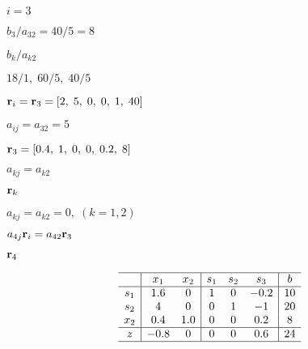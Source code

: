 \documentclass{article}
\def\lthtmlcheckvsize{\ifdim\ht\sizebox<\vsize 
  \ifdim\wd\sizebox<\hsize\expandafter\hfill\fi \expandafter\vfill
  \else\expandafter\vss\fi}%
\begin{document}
{\newpage\clearpage
{}%
$ i=3$%
\lthtmlindisplaymathZ
\lthtmlcheckvsize\clearpage}

{\newpage\clearpage
{}%
$ b_3/a_{32}=40/5=8$%
\lthtmlindisplaymathZ
\lthtmlcheckvsize\clearpage}

{\newpage\clearpage
{}%
$ b_k/a_{k2}$%
\lthtmlindisplaymathZ
\lthtmlcheckvsize\clearpage}

{\newpage\clearpage
{}%
$ 18/1,\;60/5,\;40/5$%
\lthtmlindisplaymathZ
\lthtmlcheckvsize\clearpage}

{\newpage\clearpage
{}%
$ {\bf r}_i={\bf r}_3=[2,\;5,\;0,\;0,\;1,\;40]$%
\lthtmlindisplaymathZ
\lthtmlcheckvsize\clearpage}

{\newpage\clearpage
{}%
$ a_{ij}=a_{32}=5$%
\lthtmlindisplaymathZ
\lthtmlcheckvsize\clearpage}

{\newpage\clearpage
{}%
$ {\bf r}_3=[0.4,\;1,\;0,\;0,\;0.2,\;8]$%
\lthtmlindisplaymathZ
\lthtmlcheckvsize\clearpage}

{\newpage\clearpage
{}%
$ a_{kj}=a_{k2}$%
\lthtmlindisplaymathZ
\lthtmlcheckvsize\clearpage}

{\newpage\clearpage
{}%
$ {\bf r}_k$%
\lthtmlindisplaymathZ
\lthtmlcheckvsize\clearpage}

{\newpage\clearpage
{}%
$ a_{kj}=a_{k2}=0, \;(k=1,2)$%
\lthtmlindisplaymathZ
\lthtmlcheckvsize\clearpage}

{\newpage\clearpage
{}%
$ a_{4j}{\bf r}_i=a_{42}{\bf r}_3$%
\lthtmlindisplaymathZ
\lthtmlcheckvsize\clearpage}

{\newpage\clearpage
{}%
$ {\bf r}_4$%
\lthtmlindisplaymathZ
\lthtmlcheckvsize\clearpage}

{\newpage\clearpage
{}%
\begin{displaymath}\begin{array}{c|cc|ccc|c}     \hline
& x_1 & x_2 & s_1 & s_2 & s_3  &  b  \\\hline
s_1 &1.6& 0 & 1 & 0 &-0.2& 10  \\
s_2 & 4 & 0 & 0 & 1 &-1  & 20  \\
x_2 &0.4&1.0& 0 & 0 & 0.2&  8  \\\hline
z &-0.8& 0 & 0 & 0 &0.6& 24  \\\hline
\end{array}\end{displaymath}%
\lthtmldisplayZ
\lthtmlcheckvsize\clearpage}
\end{document}
